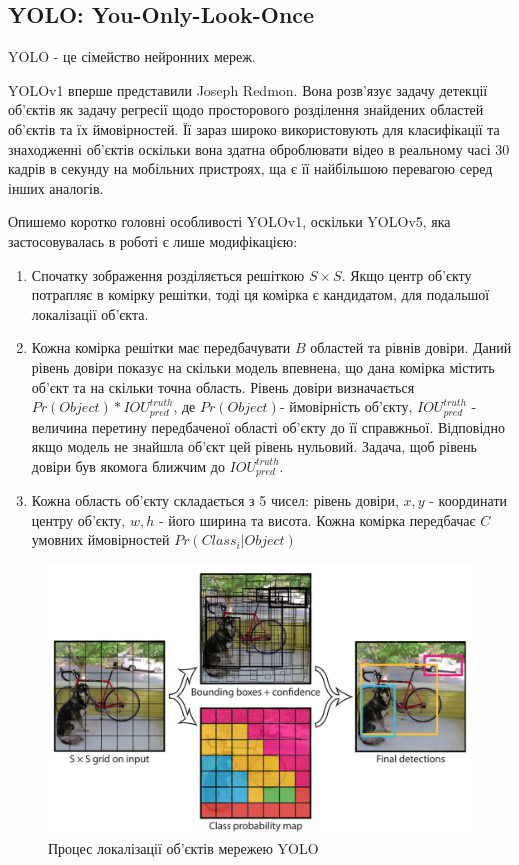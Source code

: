 \subsection{YOLO: You-Only-Look-Once}

YOLO - це сімейство нейронних мереж.

YOLOv1 вперше представили Joseph Redmon.
Вона розв'язує задачу детекції об'єктів як задачу регресії
щодо просторового розділення знайдених областей об'єктів та їх
ймовірностей. Її зараз широко використовують для класифікації та знаходженні об'єктів
оскільки вона здатна оброблювати відео в реальному часі 30 кадрів в секунду
на мобільних пристроях, ща є її найбільшою перевагою серед інших аналогів.

Опишемо коротко головні особливості YOLOv1, оскільки YOLOv5, яка застосовувалась
в роботі є лише модифікацією:
\begin{enumerate}
    \item Спочатку зображення розділяється решіткою $S \times S$.
          Якщо центр об'єкту потрапляє в комірку решітки, тоді ця комірка
          є кандидатом, для подальшої локалізації об'єкта.
    \item Кожна комірка решітки має передбачувати $B$ областей та рівнів
          довіри. Даний рівень довіри показує на скільки модель впевнена,
          що дана комірка містить об'єкт та на скільки точна область.
          Рівень довіри визначається $Pr(Object)*{IOU}_{pred}^{truth}$,
          де $Pr(Object)$- ймовірність об'єкту, ${IOU}_{pred}^{truth}$ - величина
          перетину передбаченої області об'єкту до її справжньої.
          Відповідно якщо модель не знайшла об'єкт цей рівень нульовий.
          Задача, щоб рівень довіри був якомога ближчим до ${IOU}_{pred}^{truth}$.
    \item Кожна область об'єкту складається з 5 чисел: рівень довіри,
          $x, y$ - координати центру об'єкту,  $w, h$ - його ширина та висота.
          Кожна комірка передбачає $C$ умовних ймовірностей $Pr(Class_i|Object)$
\end{enumerate}

\begin{figure}[H]
    \includegraphics[width=0.5\linewidth]{images/cnn_yolo1}
    \centering
    \caption{Процес локалізації об'єктів мережею YOLO \cite{RedmonYolo}
    }
\end{figure}

